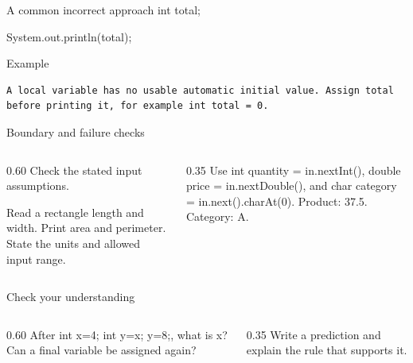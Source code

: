 \documentclass[10pt,aspectratio=169]{beamer}
\begin{document}
\begin{frame}[fragile,t]{A common incorrect approach}
int total;\par System.out.println(total);
\vspace{1mm}\begin{block}{Example}
\begin{lstlisting}
A local variable has no usable automatic initial value. Assign total before printing it, for example int total = 0.
\end{lstlisting}
\end{block}
\end{frame}

\begin{frame}[fragile,t]{Boundary and failure checks}
\begin{columns}[T,onlytextwidth]\begin{column}{0.60\textwidth}
Check the stated input assumptions.

Read a rectangle length and width. Print area and perimeter. State the units and allowed input range.
\end{column}\begin{column}{0.35\textwidth}\small
Use int quantity = in.nextInt(), double price = in.nextDouble(), and char category = in.next().charAt(0). Product: 37.5. Category: A.
\end{column}\end{columns}
\end{frame}

\begin{frame}[fragile,t]{Check your understanding}
\begin{columns}[T,onlytextwidth]\begin{column}{0.60\textwidth}
After int x=4; int y=x; y=8;, what is x? Can a final variable be assigned again?
\end{column}\begin{column}{0.35\textwidth}\small
Write a prediction and explain the rule that supports it.
\end{column}\end{columns}
\end{frame}
\end{document}
